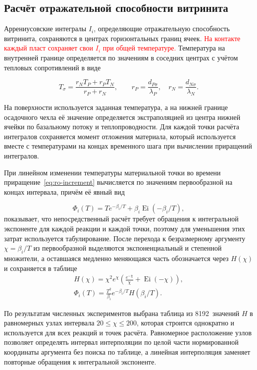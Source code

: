 

\subsection{Расчёт отражательной способности витринита}

Аррениусовские интегралы $I_i$, определяющие отражательную способность витринита, сохраняются в центрах горизонтальных границ ячеек. \textcolor{red}{На контакте каждый пласт сохраняет свои $I_i$ при общей температуре.} Температура на внутренней границе определяется по значениям в соседних центрах с учётом тепловых сопротивлений в виде

\begin{equation}
 T_\sigma = \frac{r_N T_P + r_P T_N}{r_P + r_N},\qquad
 r_P = \frac{d_{P\sigma}}{\lambda_P},\quad
 r_N = \frac{d_{N\sigma}}{\lambda_N}.
\end{equation}

На поверхности используется заданная температура, а на нижней границе осадочного чехла её значение определяется экстраполяцией из центра нижней ячейки по базальному потоку и теплопроводности. Для каждой точки расчёта интегралов сохраняется момент отложения материала, который используется вместе с температурами на концах временного шага при вычислении приращений интегралов.

При линейном изменении температуры материальной точки во времени приращение~\eqref{eq:ro-increment} вычисляется по значениям первообразной на концах интервала, причём её явный вид

\begin{equation}
 \Phi_i(T) = T e^{-\beta_i/T} + \beta_i\operatorname{Ei}(-\beta_i/T),
\end{equation}
показывает, что непосредственный расчёт требует обращения к интегральной экспоненте для каждой реакции и каждой точки, поэтому для уменьшения этих затрат используется табулирование. После перехода к безразмерному аргументу $\chi=\beta_i/T$ из первообразной выделяются экспоненциальный и степенной множители, а оставшаяся медленно меняющаяся часть обозначается через $H(\chi)$ и сохраняется в таблице
\begin{gather}
 H(\chi) = \chi^2 e^\chi\left(\frac{e^{-\chi}}{\chi} + \operatorname{Ei}(-\chi)\right),\\
 \Phi_i(T) = \frac{T^2}{\beta_i}e^{-\beta_i/T} H(\beta_i/T).
\end{gather}

По результатам численных экспериментов выбрана таблица из 8192~значений $H$ в равномерных узлах интервала $20\leq\chi\leq200$, которая строится однократно и используется для всех реакций и точек расчёта. Равномерное расположение узлов позволяет определять интервал интерполяции по целой части нормированной координаты аргумента без поиска по таблице, а линейная интерполяция заменяет повторные обращения к интегральной экспоненте.

